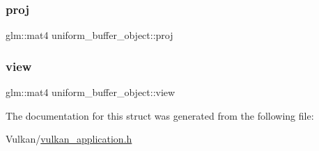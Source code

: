 \mbox{\label{structuniform__buffer__object_a92ef1d632442b62d88415f34d9f33ec0}} 
\subsubsection{\texorpdfstring{proj}{proj}}
{\footnotesize\ttfamily glm\+::mat4 uniform\+\_\+buffer\+\_\+object\+::proj}

\mbox{\label{structuniform__buffer__object_abe6dc585a59bf2e22afc19bae9e4d478}} 
\subsubsection{\texorpdfstring{view}{view}}
{\footnotesize\ttfamily glm\+::mat4 uniform\+\_\+buffer\+\_\+object\+::view}



The documentation for this struct was generated from the following file\+:\begin{DoxyCompactItemize}
\item 
Vulkan/\mbox{\hyperlink{vulkan__application_8h}{vulkan\+\_\+application.\+h}}\end{DoxyCompactItemize}
